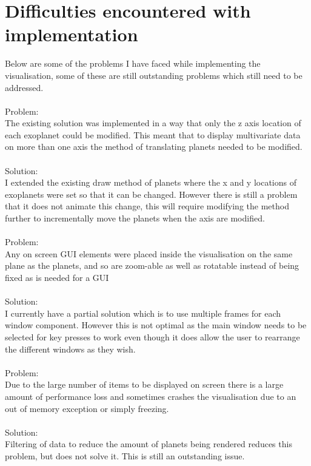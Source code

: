 \documentclass[11pt
              , a4paper
              , twoside
              , openright
              ]{report}
\begin{document}
\section{Difficulties encountered with implementation}
Below are some of the problems I have faced while implementing the
visualisation, some of these are still outstanding problems which still need to
be addressed.
\\\\
Problem:\\
The existing solution was implemented in a way that only the z axis location of
each exoplanet could be modified. This meant that to display multivariate data
on more than one axis the method of translating planets needed to be modified.
\\\\
Solution:\\
I extended the existing draw method of planets where the x and y locations of
exoplanets were set so that it can be changed. However there is still a problem
that it does not animate this change, this will require modifying the method
further to incrementally move the planets when the axis are modified.
\\\\
Problem:\\
Any on screen GUI elements were placed inside the visualisation on the same
plane as the planets, and so are zoom-able as well as rotatable instead of being
fixed as is needed for a GUI
\\\\
Solution:\\
I currently have a partial solution which is to use multiple frames for each
window component. However this is not optimal as the main window needs to be
selected for key presses to work even though it does allow the user to rearrange
the different windows as they wish. 
\\\\
Problem: \\
Due to the large number of items to be displayed on screen there is a large
amount of performance loss and sometimes crashes the visualisation due to an out
of memory exception or simply freezing.
\\\\
Solution:\\
Filtering of data to reduce the amount of planets being rendered reduces this
problem, but does not solve it. This is still an outstanding issue.
\\\\
\end{document}
